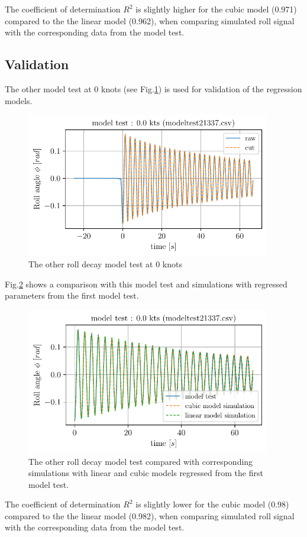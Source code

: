 The coefficient of determination $R^2$ is slightly higher for the
cubic model (0.971) compared to the the linear model (0.962), when
comparing simulated roll signal with the corresponding data from the
model test.
\hypertarget{validation}{%
\subsection*{Validation}\label{validation}}
The other model test at 0 knots (see
Fig.\ref{fig:other_roll_decay}) is used for validation of the
regression models.
\begin{figure}[H]
\begin{center}\includegraphics[width = 0.95\textwidth]{figures/other_roll_decay.pdf}\end{center}
\vspace{-0.7cm}
\caption{The other roll decay model test at 0 knots}
\label{fig:other_roll_decay}
\end{figure}
Fig.\ref{fig:other_roll_decay_sim} shows a comparison with this
model test and simulations with regressed parameters from the first
model test.
\begin{figure}[H]
\begin{center}\includegraphics[width = 0.95\textwidth]{figures/other_roll_decay_sim.pdf}\end{center}
\vspace{-0.7cm}
\caption{The other roll decay model test compared with corresponding simulations with linear and cubic models regressed from the first model test.}
\label{fig:other_roll_decay_sim}
\end{figure}
The coefficient of determination $R^2$ is slightly lower for the cubic
model (0.98) compared to the the linear model (0.982), when comparing
simulated roll signal with the corresponding data from the model test.

